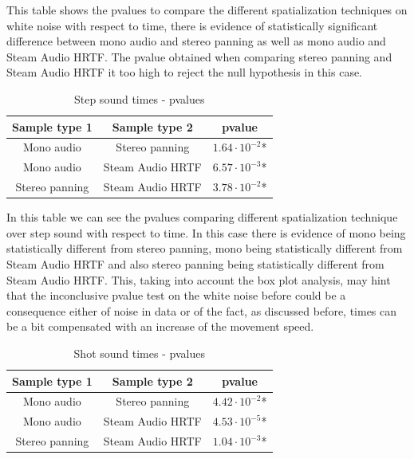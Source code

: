 \documentclass[conference]{IEEEtran}
\begin{document}
This table shows the pvalues to compare the different spatialization techniques on white noise with respect to time, there is evidence of statistically significant difference between mono audio and stereo panning as well as mono audio and Steam Audio HRTF. The pvalue obtained when comparing stereo panning and Steam Audio HRTF it too high to reject the null hypothesis in this case.

\begin{table}[htbp]
\caption{Step sound times - pvalues}
\begin{center}
\begin{tabular}{|c|c|c|}
\hline
\textbf{Sample type 1} & \textbf{Sample type 2} & \textbf{pvalue}\\
\hline
Mono audio & Stereo panning & $1.64 \cdot 10^{-2}$*\\
\hline
Mono audio & Steam Audio HRTF & $6.57 \cdot 10^{-3}$*\\
\hline
Stereo panning & Steam Audio HRTF & $3.78 \cdot 10^{-2}$*\\
\hline
\end{tabular}
\label{tab2}
\end{center}
\end{table}

In this table we can see the pvalues comparing different spatialization technique over step sound with respect to time. In this case there is evidence of mono being statistically different from stereo panning, mono being statistically different from Steam Audio HRTF and also stereo panning being statistically different from Steam Audio HRTF. This, taking into account the box plot analysis, may hint that the inconclusive pvalue test on the white noise before could be a consequence either of noise in data or of the fact, as discussed before, times can be a bit compensated with an increase of the movement speed.

\begin{table}[htbp]
\caption{Shot sound times - pvalues}
\begin{center}
\begin{tabular}{|c|c|c|}
\hline
\textbf{Sample type 1} & \textbf{Sample type 2} & \textbf{pvalue}\\
\hline
Mono audio & Stereo panning & $4.42 \cdot 10^{-2}$*\\
\hline
Mono audio & Steam Audio HRTF & $4.53 \cdot 10^{-5}$*\\
\hline
Stereo panning & Steam Audio HRTF & $1.04 \cdot 10^{-3}$*\\
\hline
\end{tabular}
\label{tab3}
\end{center}
\end{table}
\end{document}
